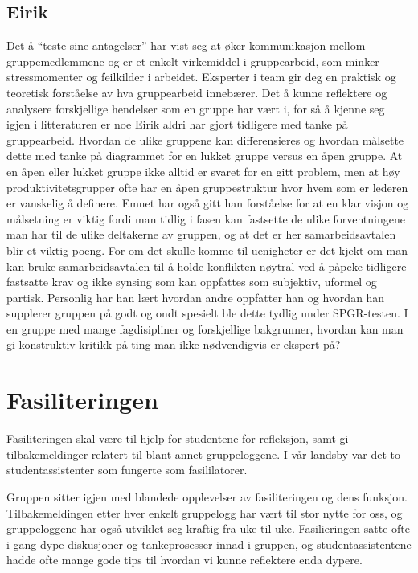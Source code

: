 \documentclass[a4paper,norsk,oneside]{article}
\begin{document}
\subsection{Eirik}
Det å “teste sine antagelser” har vist seg at øker kommunikasjon mellom gruppemedlemmene og er et enkelt virkemiddel i gruppearbeid, som minker stressmomenter og feilkilder i arbeidet. Eksperter i team gir deg en praktisk og teoretisk forståelse av hva gruppearbeid innebærer. Det å kunne reflektere og analysere forskjellige hendelser som en gruppe har vært i, for så å kjenne seg igjen i litteraturen er noe Eirik aldri har gjort tidligere med tanke på gruppearbeid. Hvordan de ulike gruppene kan differensieres og hvordan målsette dette med tanke på diagrammet for en lukket gruppe versus en åpen gruppe. At en åpen eller lukket gruppe ikke alltid er svaret for en gitt problem, men at høy produktivitetsgrupper ofte har en åpen gruppestruktur hvor hvem som er lederen er vanskelig å definere. Emnet har også gitt han forståelse for at en klar visjon og målsetning er viktig fordi man tidlig i fasen kan fastsette de ulike forventningene man har til de ulike deltakerne av gruppen, og at det er her samarbeidsavtalen blir et viktig poeng. For om det skulle komme til uenigheter er det kjekt om man kan bruke samarbeidsavtalen til å holde konflikten nøytral ved å påpeke tidligere fastsatte krav og ikke synsing som kan oppfattes som subjektiv, uformel og partisk. Personlig har han lært hvordan andre oppfatter han og hvordan han supplerer gruppen på godt og ondt spesielt ble dette tydlig under SPGR-testen. I en gruppe med mange fagdisipliner og forskjellige bakgrunner, hvordan kan man gi konstruktiv kritikk på ting man ikke nødvendigvis er ekspert på? 

\section{Fasiliteringen}
Fasiliteringen skal være til hjelp for studentene for refleksjon, samt gi tilbakemeldinger relatert til blant annet gruppeloggene. I vår landsby var det to studentassistenter som fungerte som fasililatorer. 

Gruppen sitter igjen med  blandede opplevelser av fasiliteringen og dens funksjon. Tilbakemeldingen etter hver enkelt gruppelogg har vært til stor nytte for oss, og gruppeloggene har også utviklet seg kraftig fra uke til uke. Fasilieringen satte ofte i gang dype diskusjoner og tankeprosesser innad i gruppen, og studentassistentene hadde ofte mange gode tips til hvordan vi kunne reflektere enda dypere. 
\end{document}
